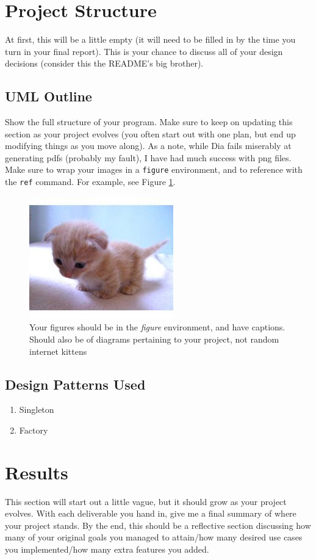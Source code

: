 \documentclass[10pt,conference,onecolumn,compsoc]{IEEEtran}
\begin{document}
\section{Project Structure}
At first, this will be a little empty (it will need to be filled in by the time you turn in your final report).  This is your chance to discuss all of your design decisions (consider this the README's big brother).

\subsection{UML Outline}
Show the full structure of your program.  Make sure to keep on updating this section as your project evolves (you often start out with one plan, but end up modifying things as you move along).  As a note, while Dia fails miserably at generating pdfs (probably my fault), I have had much success with png files.  Make sure to wrap your images in a \texttt{figure} environment, and to reference with the \texttt{ref} command.  For example, see Figure \ref{cat2}.

\begin{figure}[ht!]
\includegraphics[scale=1.5]{cat2.jpg}
\caption{Your figures should be in the \emph{figure} environment, and have captions.  Should also be of diagrams pertaining to your project, not random internet kittens}
\label{cat2}
\end{figure}


\subsection{Design Patterns Used}
\begin{enumerate}
\item Singleton
\item Factory
\end{enumerate}


\section{Results}
This section will start out a little vague, but it should grow as your project evolves.  With each deliverable you hand in, give me a final summary of where your project stands.  By the end, this should be a reflective section discussing how many of your original goals you managed to attain/how many desired use cases you implemented/how many extra features you added.
\end{document}
